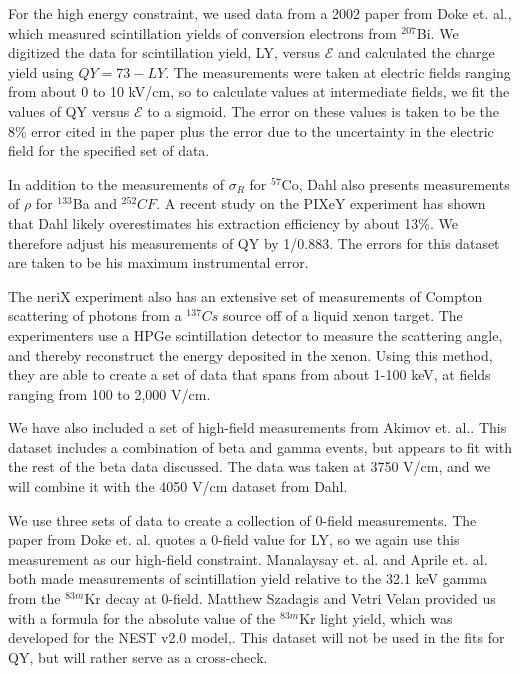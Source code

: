 For the high energy constraint, we used data from a 2002 paper from Doke et. al., which measured scintillation yields of conversion electrons from $^{207}$Bi\cite{doke2002}. We digitized the data for scintillation yield, LY, versus $\mathcal{E}$ and calculated the charge yield using $QY=73-LY$. The measurements were taken at electric fields ranging from about 0 to 10 kV/cm, so to calculate values at intermediate fields, we fit the values of QY versus $\mathcal{E}$ to a sigmoid. The error on these values is taken to be the 8\% error cited in the paper plus the error due to the uncertainty in the electric field for the specified set of data.

In addition to the measurements of $\sigma_R$ for $^{57}$Co, Dahl also presents measurements of $\rho$ for $^{133}$Ba and $^{252}CF$\cite{dahl}. A recent study on the PIXeY experiment has shown that Dahl likely overestimates his extraction efficiency by about 13\%\cite{pixey_extraction}. We therefore adjust his measurements of QY by 1/0.883. The errors for this dataset are taken to be his maximum instrumental error.

The neriX experiment also has an extensive set of measurements of Compton scattering of photons from a $^{137}Cs$ source off of a liquid xenon target\cite{nerix}. The experimenters use a HPGe scintillation detector to measure the scattering angle, and thereby reconstruct the energy deposited in the xenon. Using this method, they are able to create a set of data that spans from about 1-100 keV, at fields ranging from 100 to 2,000 V/cm.

We have also included a set of high-field measurements from Akimov et. al.\cite{akimov}. This dataset includes a combination of beta and gamma events, but appears to fit with the rest of the beta data discussed. The data was taken at 3750 V/cm, and we will combine it with the 4050 V/cm dataset from Dahl.

We use three sets of data to create a collection of 0-field measurements. The paper from Doke et. al. quotes a 0-field value for LY, so we again use this measurement as our high-field constraint. Manalaysay et. al. and Aprile et. al. both made measurements of scintillation yield relative to the 32.1 keV gamma from the $^{83m}$Kr decay at 0-field\cite{zerofield1,zerofield2}. Matthew Szadagis and Vetri Velan provided us with a formula for the absolute value of the $^{83m}$Kr light yield, which was developed for the NEST v2.0 model,\cite{matthew}. This dataset will not be used in the fits for QY, but will rather serve as a cross-check.

